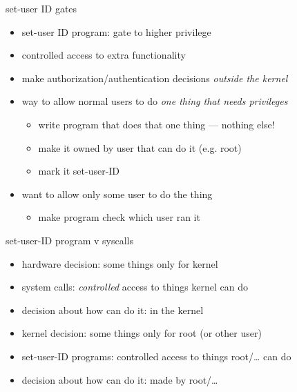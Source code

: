 
\begin{frame}{set-user ID gates}
\begin{itemize}
\item set-user ID program: gate to higher privilege
\vspace{.5cm}
\item controlled access to extra functionality
\item make authorization/authentication decisions \textit{outside the kernel}
\item way to allow normal users to do \textit{one thing that needs privileges}
    \begin{itemize}
    \item write program that does that one thing --- nothing else!
    \item make it owned by user that can do it (e.g. root)
    \item mark it set-user-ID
    \end{itemize}
\item want to allow only some user to do the thing
    \begin{itemize}
    \item make program check which user ran it
    \end{itemize}
\end{itemize}
\end{frame}


\begin{frame}{set-user-ID program v syscalls}
\begin{itemize}
\item hardware decision: some things only for kernel
\item system calls: \textit{controlled} access to things kernel can do
\item decision about how can do it: in the kernel
\vspace{.5cm}
\item kernel decision: some things only for root (or other user)
\item set-user-ID programs: controlled access to things root/\ldots{} can do
\item decision about how can do it: made by root/\ldots
\end{itemize}
\end{frame}

